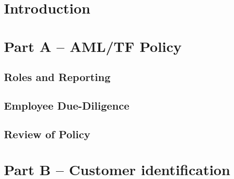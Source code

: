 \documentclass[12pt]{report}
\begin{document}
\renewcommand{\thechapter}{I}%
\chapter*{Introduction}

\renewcommand{\thechapter}{A}%
\chapter*{Part A -- AML/TF Policy}

\section{Roles and Reporting}

\section{Employee Due-Diligence}

\section{Review of Policy}

\renewcommand{\thechapter}{B}%
\chapter*{Part B -- Customer identification}
\end{document}
